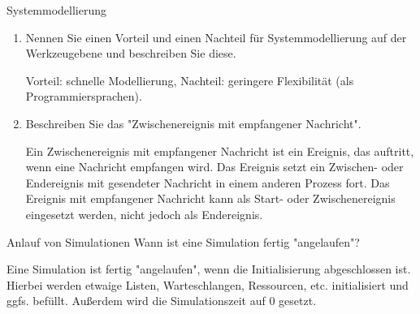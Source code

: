 \documentclass{article}
\begin{document}
\begin{exercise}{Systemmodellierung}
  \begin{enumerate}
    \item Nennen Sie einen Vorteil und einen Nachteil für Systemmodellierung auf der Werkzeugebene und beschreiben Sie diese.
          \begin{solution}
            Vorteil: schnelle Modellierung, Nachteil: geringere Flexibilität (als Programmiersprachen).
          \end{solution}
    \item Beschreiben Sie das "Zwischenereignis mit empfangener Nachricht".
          \begin{solution}
            Ein Zwischenereignis mit empfangener Nachricht ist ein Ereignis, das auftritt, wenn eine Nachricht empfangen wird. Das Ereignis setzt ein Zwischen- oder Endereignis mit gesendeter Nachricht in einem anderen Prozess fort. Das Ereignis mit empfangener Nachricht kann als Start- oder Zwischenereignis eingesetzt werden, nicht jedoch als Endereignis.
          \end{solution}
  \end{enumerate}
\end{exercise}

\begin{exercise}{Anlauf von Simulationen}
  Wann ist eine Simulation fertig "angelaufen"?

  \begin{solution}
    Eine Simulation ist fertig "angelaufen", wenn die Initialisierung abgeschlossen ist. Hierbei werden etwaige Listen, Warteschlangen, Ressourcen, etc. initialisiert und ggfs. befüllt. Außerdem wird die Simulationszeit auf 0 gesetzt.
  \end{solution}
\end{exercise}
\end{document}
